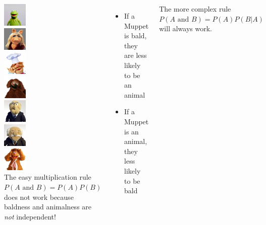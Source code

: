 \documentclass{beamer}\usepackage[]{graphicx}\usepackage[]{color}
\begin{document}
\begin{darkframes}
\begin{frame}
  \begin{columns}[onlytextwidth]
      \includegraphics[width=0.45in]{kermitthefrog} \\
      \includegraphics[width=0.45in]{misspiggy} \\
      \includegraphics[width=0.45in]{swedishchef} \\
      \includegraphics[width=0.45in]{rowlf} \\
      \includegraphics[width=0.45in]{statler} \\
      \includegraphics[width=0.45in]{waldorf} \\
      \includegraphics[width=0.45in]{fozziebear} \\
    The easy multiplication rule $P(\text{$A$ and $B$})=P(A)P(B)$ does not work because baldness and animalness are \emph{not} independent!
    \pause
    \begin{itemize}[<+->]
      \item If a Muppet is bald, they are less likely to be an animal
      \item If a Muppet is an animal, they less likely to be bald
    \end{itemize}
    \pause
    The more complex rule $P(\text{$A$ and $B$})=P(A)P(B|A)$ will always work.
  \end{columns}
\end{frame}



\end{darkframes}
\end{document}
